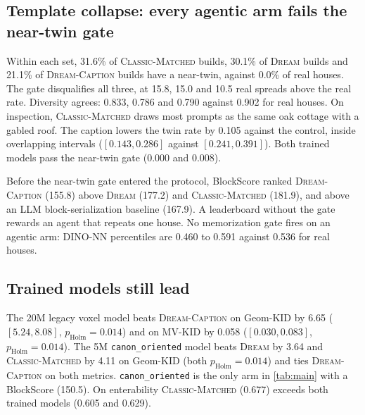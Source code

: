\subsection{Template collapse: every agentic arm fails the near-twin gate}

Within each set, 31.6\% of \textsc{Classic-Matched} builds, 30.1\% of \textsc{Dream} builds and 21.1\% of \textsc{Dream-Caption} builds have a near-twin, against 0.0\% of real houses. %
The gate disqualifies all three, at 15.8, 15.0 and 10.5 real spreads above the real rate. %
Diversity agrees: 0.833, 0.786 and 0.790 against 0.902 for real houses. %
On inspection, \textsc{Classic-Matched} draws most prompts as the same oak cottage with a gabled roof. %
The caption lowers the twin rate by 0.105 against the control, inside overlapping intervals ($[0.143, 0.286]$ against $[0.241, 0.391]$). %
Both trained models pass the near-twin gate (0.000 and 0.008). %

Before the near-twin gate entered the protocol, BlockScore ranked \textsc{Dream-Caption} (155.8) above \textsc{Dream} (177.2) and \textsc{Classic-Matched} (181.9), and above an LLM block-serialization baseline (167.9). %
A leaderboard without the gate rewards an agent that repeats one house. %
No memorization gate fires on an agentic arm: DINO-NN percentiles are 0.460 to 0.591 against 0.536 for real houses. %

\subsection{Trained models still lead}

The 20M legacy voxel model beats \textsc{Dream-Caption} on Geom-KID by 6.65 ($[5.24, 8.08]$, $p_{\text{Holm}}{=}0.014$) and on MV-KID by 0.058 ($[0.030, 0.083]$, $p_{\text{Holm}}{=}0.014$). %
The 5M \texttt{canon\_oriented} model beats \textsc{Dream} by 3.64 and \textsc{Classic-Matched} by 4.11 on Geom-KID (both $p_{\text{Holm}}{=}0.014$) and ties \textsc{Dream-Caption} on both metrics. %
\texttt{canon\_oriented} is the only arm in \cref{tab:main} with a BlockScore (150.5). %
On enterability \textsc{Classic-Matched} (0.677) exceeds both trained models (0.605 and 0.629). %

